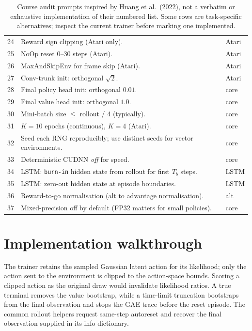 \documentclass[11pt,oneside]{scrbook}
\begin{document}
\begin{table}[h!]
\begin{tabular}{lp{8.5cm}l}
24 & Reward sign clipping (Atari only). & Atari \\
25 & NoOp reset 0--30 steps (Atari). & Atari \\
26 & MaxAndSkipEnv for frame skip (Atari). & Atari \\
27 & Conv-trunk init: orthogonal $\sqrt{2}$. & Atari \\
28 & Final policy head init: orthogonal $0.01$. & core \\
29 & Final value head init: orthogonal $1.0$. & core \\
30 & Mini-batch size $\le$ rollout / 4 (typically). & core \\
31 & $K=10$ epochs (continuous), $K=4$ (Atari). & core \\
32 & Seed each RNG reproducibly; use distinct seeds for vector environments. & core \\
33 & Deterministic CUDNN \emph{off} for speed. & core \\
34 & LSTM: \texttt{burn-in} hidden state from rollout for first $T_b$ steps. & LSTM \\
35 & LSTM: zero-out hidden state at episode boundaries. & LSTM \\
36 & Reward-to-go normalisation (alt to advantage normalisation). & alt \\
37 & Mixed-precision off by default (FP32 matters for small policies). & core \\
\bottomrule
\end{tabular}
\caption{Course audit prompts inspired by Huang et al.\ (2022), not a
verbatim or exhaustive implementation of their numbered list. Some rows
are task-specific alternatives; inspect the current trainer before marking one implemented.}
\end{table}

\chapter{Implementation walkthrough}

The trainer retains the sampled Gaussian latent action for its likelihood;
only the action sent to the environment is clipped to the action-space bounds.
Scoring a clipped action as the original draw would invalidate likelihood ratios.
A true terminal removes the value bootstrap, while a time-limit truncation
bootstraps from the final observation and stops the GAE trace before the
reset episode. The common rollout helpers request same-step autoreset and
recover the final observation supplied in its info dictionary.
\end{document}
